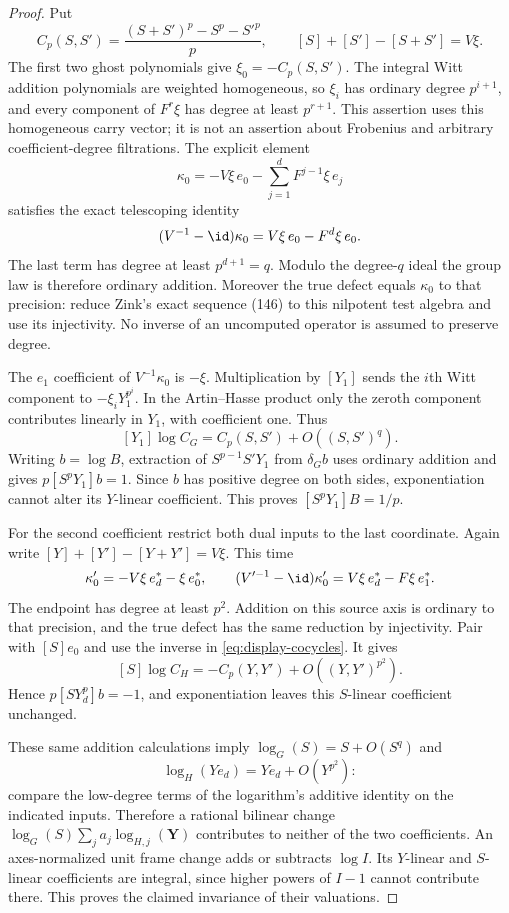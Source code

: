 \begin{proof}
Put
\[
 C_p(S,S')=\frac{(S+S')^p-S^p-S'^p}{p},\qquad
 [S]+[S']-[S+S']=V\xi.
\]
The first two ghost polynomials give $\xi_0=-C_p(S,S')$. The integral Witt addition polynomials are weighted homogeneous, so $\xi_i$ has ordinary degree $p^{i+1}$, and every component of $F^r\xi$ has degree at least $p^{r+1}$. This assertion uses this homogeneous carry vector; it is not an assertion about Frobenius and arbitrary coefficient-degree filtrations. The explicit element
\[
 \kappa_0=-V\xi\,e_0-\sum_{j=1}^dF^{j-1}\xi\,e_j
\]
satisfies the exact telescoping identity
\[
 (V^{-1}-\id)\kappa_0=V\xi\,e_0-F^d\xi\,e_0.
\]
The last term has degree at least $p^{d+1}=q$. Modulo the degree-$q$ ideal the group law is therefore ordinary addition. Moreover the true defect equals $\kappa_0$ to that precision: reduce Zink's exact sequence (146) to this nilpotent test algebra and use its injectivity. No inverse of an uncomputed operator is assumed to preserve degree.

The $e_1$ coefficient of $V^{-1}\kappa_0$ is $-\xi$. Multiplication by $[Y_1]$ sends the $i$th Witt component to $-\xi_iY_1^{p^i}$. In the Artin--Hasse product only the zeroth component contributes linearly in $Y_1$, with coefficient one. Thus
\[
 [Y_1]\log C_G=C_p(S,S')+O((S,S')^q).
\]
Writing $b=\log B$, extraction of $S^{p-1}S'Y_1$ from $\delta_G b$ uses ordinary addition and gives $p[S^pY_1]b=1$. Since $b$ has positive degree on both sides, exponentiation cannot alter its $Y$-linear coefficient. This proves $[S^pY_1]B=1/p$.

For the second coefficient restrict both dual inputs to the last coordinate. Again write $[Y]+[Y']-[Y+Y']=V\xi$. This time
\[
 \kappa'_0=-V\xi\,e_d^*-\xi\,e_0^*,\qquad
 (V'^{-1}-\id)\kappa'_0=V\xi\,e_d^*-F\xi\,e_1^*.
\]
The endpoint has degree at least $p^2$. Addition on this source axis is ordinary to that precision, and the true defect has the same reduction by injectivity. Pair with $[S]e_0$ and use the inverse in \eqref{eq:display-cocycles}. It gives
\[
 [S]\log C_H=-C_p(Y,Y')+O((Y,Y')^{p^2}).
\]
Hence $p[SY_d^p]b=-1$, and exponentiation leaves this $S$-linear coefficient unchanged.

These same addition calculations imply $\log_G(S)=S+O(S^q)$ and
\[
 \log_H(Ye_d)=Ye_d+O(Y^{p^2}):
\]
compare the low-degree terms of the logarithm's additive identity on the indicated inputs. Therefore a rational bilinear change $\log_G(S)\sum_j a_j\log_{H,j}(\mathbf Y)$ contributes to neither of the two coefficients. An axes-normalized unit frame change adds or subtracts $\log I$. Its $Y$-linear and $S$-linear coefficients are integral, since higher powers of $I-1$ cannot contribute there. This proves the claimed invariance of their valuations.


\end{proof}
